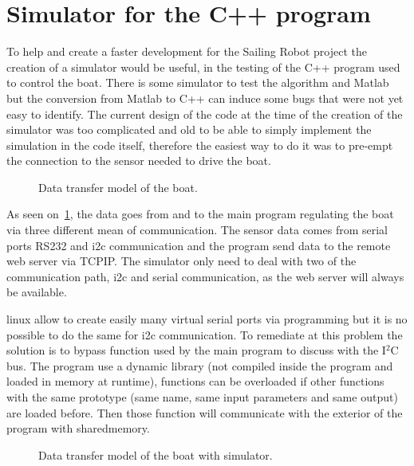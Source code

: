 \section{Simulator for the C++ program} \label{sec:simulator}

To help and create a faster development for the Sailing Robot project the creation of a simulator would be useful, in the testing of the \gls{C++} program used to control the boat. 
There is some simulator to test the algorithm and Matlab but the conversion from Matlab to C++ can induce some bugs that were not yet easy to identify.
The current design of the code at the time of the creation of the simulator was too complicated and old to be able to simply implement the simulation in the code itself, therefore the easiest way to do it was to pre-empt the connection to the sensor needed to drive the boat.

\begin{figure}[H]
\centering
{} %
{

}
\caption{Data transfer model of the boat.}
\label{fig:model_boat_}
\end{figure}

As seen on~\ref{fig:model_boat_}, the data goes from and to the main program regulating the boat via three different mean of communication.
The sensor data comes from serial ports \gls{RS232} and \gls{i2c} communication and the program send data to the remote web server via \gls{TCPIP}. The simulator only need to deal with two of the communication path, \gls{i2c} and serial communication, as the web server will always be available. 

\gls{linux} allow to create easily many virtual serial ports via programming but it is no possible to do the same for \gls{i2c} communication. To remediate at this problem the solution is to bypass function used by the main program to discuss with the I$^2$C bus. The program use a dynamic library (not compiled inside the program  and loaded in memory at runtime), functions can be overloaded if other functions with the same prototype (same name, same input parameters and same output) are loaded before. Then those function will communicate with the exterior of the program  with \gls{sharedmemory}.

\begin{figure}[H]
\centering
{} %
{

}
\caption{Data transfer model of the boat with simulator.}
\label{fig:model_boat_sim}
\end{figure}

